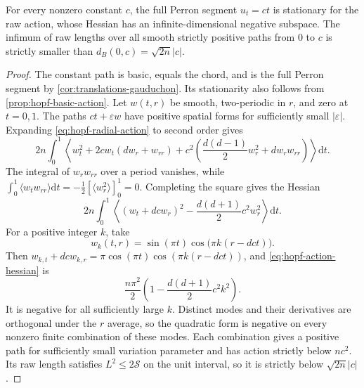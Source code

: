 \begin{theorem}\label{thm:hopf-action-saddle}
For every nonzero constant $c$, the full Perron segment $u_t=ct$ is stationary for the raw action, whose Hessian has an infinite-dimensional negative subspace. The infimum of raw lengths over all smooth strictly positive paths from $0$ to $c$ is strictly smaller than $d_B(0,c)=\sqrt{2n}|c|$.
\end{theorem}
\begin{proof}
The constant path is basic, equals the chord, and is the full Perron segment by \cref{cor:translations-gauduchon}. Its stationarity also follows from \cref{prop:hopf-basic-action}.
Let $w(t,r)$ be smooth, two-periodic in $r$, and zero at $t=0,1$. The paths $ct+\varepsilon w$ have positive spatial forms for sufficiently small $|\varepsilon|$. Expanding \eqref{eq:hopf-radial-action} to second order gives
\[
 2n\int_0^1\left\langle
 w_t^2+2cw_t(dw_r+w_{rr})
 +c^2\left(\frac{d(d-1)}2w_r^2+dw_rw_{rr}\right)
 \right\rangle\mathrm dt.
\]
The integral of $w_rw_{rr}$ over a period vanishes, while
$\int_0^1\langle w_tw_{rr}\rangle\mathrm dt
=-\frac12[\langle w_r^2\rangle]_0^1=0$.
Completing the square gives the Hessian
\begin{equation}\label{eq:hopf-action-hessian}
 2n\int_0^1\left\langle
 (w_t+dcw_r)^2-\frac{d(d+1)}2c^2w_r^2
 \right\rangle\mathrm dt.
\end{equation}
For a positive integer $k$, take
\[
 w_k(t,r)=\sin(\pi t)\cos\bigl(\pi k(r-dct)\bigr).
\]
Then $w_{k,t}+dcw_{k,r}=\pi\cos(\pi t)\cos(\pi k(r-dct))$, and \eqref{eq:hopf-action-hessian} is
\[
 \frac{n\pi^2}2\left(1-\frac{d(d+1)}2c^2k^2\right).
\]
It is negative for all sufficiently large $k$. Distinct modes and their derivatives are orthogonal under the $r$ average, so the quadratic form is negative on every nonzero finite combination of these modes. Each combination gives a positive path for sufficiently small variation parameter and has action strictly below $nc^2$. Its raw length satisfies $L^2\leq2\mathscr S$ on the unit interval, so it is strictly below $\sqrt{2n}|c|$.
\end{proof}

